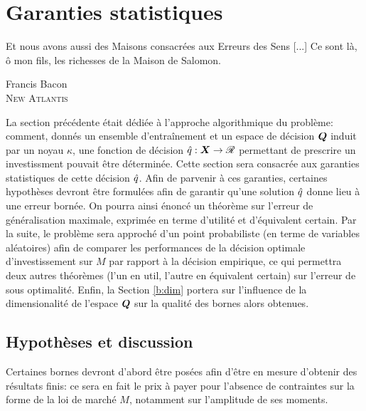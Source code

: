 \section{Garanties statistiques}
\label{sec:bound}

\epigraph{Et nous avons aussi des Maisons consacrées aux Erreurs des Sens [...] Ce sont
  là, ô mon fils, les richesses de la Maison de Salomon.}{Francis Bacon\\\textsc{New
    Atlantis}}



La section précédente était dédiée à l'approche algorithmique du problème: comment, donnés
un ensemble d'entraînement et un espace de décision $\bm Q$ induit par un noyau $\kappa$, une
fonction de décision $\hat q:\bm{X} \to \mathscr{R}$ permettant de prescrire un investissment pouvait être
déterminée. Cette section sera consacrée aux garanties statistiques de cette décision
$\hat q$. Afin de parvenir à ces garanties, certaines hypothèses devront être formulées afin
de garantir qu'une solution $\hat q$ donne lieu à une erreur bornée. On pourra ainsi énoncé
un théorème sur l'erreur de généralisation maximale, exprimée en terme d'utilité et
d'équivalent certain. Par la suite, le problème sera approché d'un point probabiliste (en
terme de variables aléatoires) afin de comparer les performances de la décision optimale
d'investissement sur $M$ par rapport à la décision empirique, ce qui permettra deux autres
théorèmes (l'un en util, l'autre en équivalent certain) sur l'erreur de sous
optimalité. Enfin, la Section \ref{b:dim} portera sur l'influence de la dimensionalité de
l'espace $\bm Q$ sur la qualité des bornes alors obtenues.

\subsection{Hypothèses et discussion}

Certaines bornes devront d'abord être posées afin d'être en mesure d'obtenir des résultats
finis: ce sera en fait le prix à payer pour l'absence de contraintes sur la forme de la
loi de marché $M$, notamment sur l'amplitude de ses moments. 

